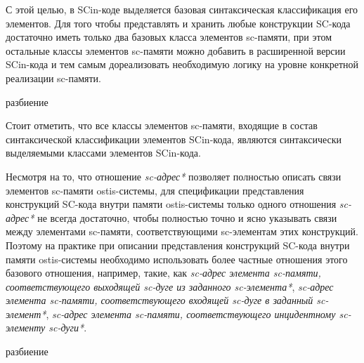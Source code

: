 С этой целью, в SCin-коде выделяется базовая синтаксическая классификация его элементов. Для того чтобы представлять и хранить любые конструкции SC-кода достаточно иметь только два базовых класса элементов sc-памяти, при этом остальные классы элементов sc-памяти можно добавить в расширенной версии SCin-кода и тем самым дореализовать необходимую логику на уровне конкретной реализации sc-памяти.

\begin{SCn}
\begin{scnsubstruct}

\begin{scnrelfromset}{разбиение}
\end{scnrelfromset}

\end{scnsubstruct}
\end{SCn}

Стоит отметить, что все классы элементов sc-памяти, входящие в состав синтаксической классификации элементов SCin-кода, являются синтаксически выделяемыми классами элементов SCin-кода.

Несмотря на то, что отношение \textit{sc-адрес*} позволяет полностью описать связи элементов sc-памяти ostis-системы, для спецификации представления конструкций SC-кода внутри памяти ostis-системы только одного отношения \textit{sc-адрес*} не всегда достаточно, чтобы полностью точно и ясно указывать связи между элементами sc-памяти, соответствующими sc-элементам этих конструкций. Поэтому на практике при описании представления конструкций SC-кода внутри памяти ostis-системы необходимо использовать более частные отношения этого базового отношения, например, такие, как \textit{sc-адрес элемента sc-памяти, соответствующего выходящей sc-дуге из заданного sc-элемента*}, \textit{sc-адрес элемента sc-памяти, соответствующего входящей sc-дуге в заданный sc-элемент*}, \textit{sc-адрес элемента sc-памяти, соответствующего инцидентному sc-элементу sc-дуги*}.

\begin{SCn}
\begin{scnrelfromset}{разбиение}
\end{scnrelfromset}
\end{SCn}

